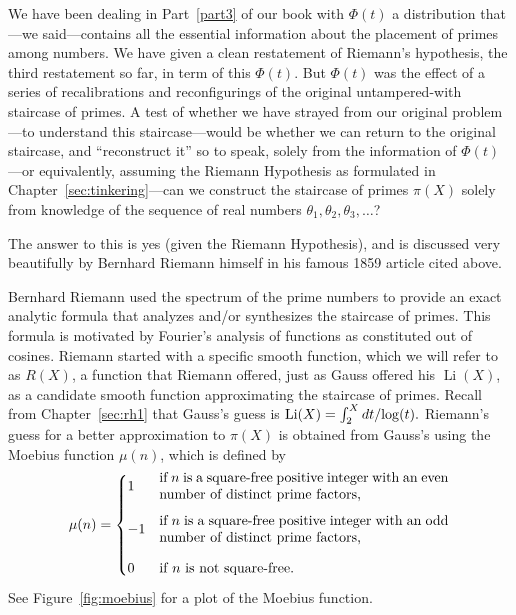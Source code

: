 \documentclass[openany]{book}
\DeclareMathOperator{\Li}{Li}
\theoremstyle{plain}
\theoremstyle{definition}
\newcommand{\RH}{Riemann Hypothesis\index{Riemann Hypothesis}}
\begin{document}
{{{  We have been dealing in Part~\ref{part3} of our book with $\Phi(t)$ a
  distribution that---we said---contains all the essential information
  about the placement of primes among numbers. We have given a clean
  restatement of Riemann's hypothesis, the third restatement so far,
  in term of this $\Phi(t)$.  But $\Phi(t)$ was the effect of a series
  of recalibrations and reconfigurings of the original untampered-with
  staircase of primes.  A test of whether we have strayed from our
  original problem---to understand this staircase---would be whether
  we can return to the original staircase, and ``reconstruct it'' so to
  speak, solely from the information of $\Phi(t)$---or equivalently,
  assuming the \RH{} as formulated in Chapter~\ref{sec:tinkering}---can
  we construct the staircase of primes $\pi(X)$ solely
  from knowledge of the sequence of real numbers $\theta_1,
  \theta_2,\theta_3,\dots$?




  The answer to this is yes (given the \RH{}), and is discussed very
  beautifully by Bernhard Riemann himself in his famous 1859 article
  cited above.

  Bernhard Riemann used the spectrum of the prime numbers to provide
  an exact analytic formula that analyzes and/or synthesizes the
  staircase of primes.  This formula is motivated by Fourier's
  analysis of functions as constituted out of cosines.  Riemann started
  with a specific smooth function, which we will refer to as $R(X)$, a
  function that Riemann offered, just as Gauss offered his $\Li(X)$,
  as a candidate smooth function approximating the staircase of
  primes.  Recall from Chapter~\ref{sec:rh1} that Gauss's guess is
  $\Li(X)= \int_2^{X}dt/{\rm log}(t).$ Riemann's guess for a better
  approximation to $\pi(X)$ is obtained from Gauss's using the Moebius
  function $\mu(n)$, which is defined by
$$
 \mu(n) = \begin{cases}
    1 &
       \mbox{\begin{minipage}{0.6\textwidth}if $n$ is a square-free
       positive integer with an even number of distinct prime
       factors,\end{minipage}}\vspace{1em}\\
    -1& \mbox{\begin{minipage}{0.6\textwidth}if $n$ is a square-free
    positive integer with an odd number of distinct
    prime factors,\end{minipage}}\vspace{1em}\\
    0 & \mbox{if $n$ is not square-free.}
 \end{cases}
 $$
 See Figure~\ref{fig:moebius} for a plot of the Moebius function.

}}}
\end{document}
